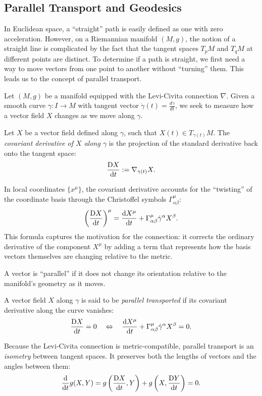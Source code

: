 \subsection{Parallel Transport and Geodesics}
\label{sub_sec:parallel_transport_and_geodesics}
In Euclidean space, a ``straight'' path is easily defined as one with zero acceleration. However, on a Riemannian manifold $(M, g)$, the notion of a straight line is complicated by the fact that the tangent spaces $T_p M$ and $T_q M$ at different points are distinct. To determine if a path is straight, we first need a way to move vectors from one point to another without ``turning'' them. This leads us to the concept of parallel transport.

Let $(M, g)$ be a manifold equipped with the Levi-Civita connection $\nabla$. Given a smooth curve $\gamma: I \to M$ with tangent vector $\dot{\gamma}(t) = \frac{d\gamma}{dt}$, we seek to measure how a vector field $X$ changes as we move along $\gamma$.

\begin{definition}
  Let $X$ be a vector field defined along $\gamma$, such that $X(t) \in T_{\gamma(t)} M$. The \emph{covariant derivative of $X$ along $\gamma$} is the projection of the standard derivative back onto the tangent space:
  \[%
    \codv{X}{t} := \nabla_{\dot{\gamma}(t)} X
  .\]%
\end{definition}

In local coordinates $\{x^\mu\}$, the covariant derivative accounts for the ``twisting'' of the coordinate basis through the Christoffel symbols $\Gamma^\mu_{\alpha\beta}$:
\[%
  \left(\codv{X}{t}\right)^\mu = \odv{X^\mu}{t} + \Gamma^\mu_{\alpha\beta} \dot{\gamma}^\alpha X^\beta
.\]%
This formula captures the motivation for the connection: it corrects the ordinary derivative of the component $X^\mu$ by adding a term that represents how the basis vectors themselves are changing relative to the metric.

A vector is ``parallel'' if it does not change its orientation relative to the manifold's geometry as it moves.

\begin{definition}
  A vector field $X$ along $\gamma$ is said to be \emph{parallel transported} if its covariant derivative along the curve vanishes:
  \[%
    \codv{X}{t} = 0 \quad \iff \quad \odv{X^\mu}{t} + \Gamma^\mu_{\alpha\beta} \dot{\gamma}^\alpha X^\beta = 0
  .\]%
\end{definition}

Because the Levi-Civita connection is metric-compatible, parallel transport is an \emph{isometry} between tangent spaces. It preserves both the lengths of vectors and the angles between them:
\[%
  \odv{}{t} g(X, Y) = g\left(\codv{X}{t}, Y\right) + g\left(X, \codv{Y}{t}\right) = 0
.\]%

